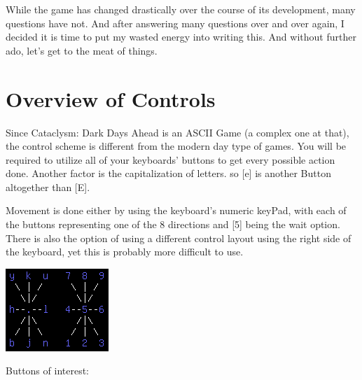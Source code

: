 \documentclass[11pt]{report}
\begin{document}
While the game has changed drastically over the course of its development, many questions have not. And after answering many questions over and over again, I decided it is time to put my wasted energy into writing this. And without further ado, let's get to the meat of things.

 
\chapter{Overview of Controls}
 
Since Cataclysm: Dark Days Ahead is an ASCII Game (a complex one at that), the control scheme is different from the modern day type of games. You will be required to utilize all of your keyboards' buttons to get every possible action done. Another factor is the capitalization of letters. so [e] is another Button altogether than [E].
 
Movement is done either by using the keyboard's numeric keyPad, with each of the buttons representing one of the 8 directions and [5] being the wait option. There is also the option of using a different control layout using the right side of the keyboard, yet this is probably more difficult to use.

\includegraphics{01}

Buttons of interest:
\end{document}
